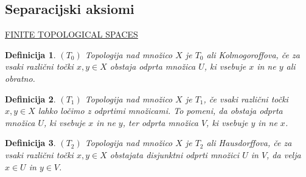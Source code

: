 \documentclass[mat1, tisk]{fmfdelo}
\newtheorem{definition}{Definicija}[subsection]
\begin{document}
\subsection{Separacijski aksiomi}
\href{https://www.math.uchicago.edu/~may/MISC/FiniteSpaces.pdf}{FINITE TOPOLOGICAL SPACES}
\begin{definition}
  $(T_0)$ Topologija nad množico $X$ je $T_0$ ali Kolmogoroffova, če za vsaki različni točki
  $x,y \in X$ obstaja odprta množica $U$, ki vsebuje $x$ in ne $y$ ali obratno.
\end{definition}
\begin{definition}
  $(T_1)$ Topologija nad množico $X$ je $T_1$, če vsaki različni točki $x,y \in X$
  lahko ločimo z odprtimi množicami. To pomeni, da obstaja odprta množica $U$,
  ki vsebuje $x$ in ne $y$, ter odprta množica $V$, ki vsebuje $y$ in ne $x$.
\end{definition}
\begin{definition}
  $(T_2)$ Topologija nad množico $X$ je $T_2$ ali Hausdorffova, če za vsaki različni
  točki $x,y \in X$ obstajata disjunktni odprti množici $U$ in $V$, da velja
  $x \in U$ in $y \in V$.
\end{definition}
\end{document}
